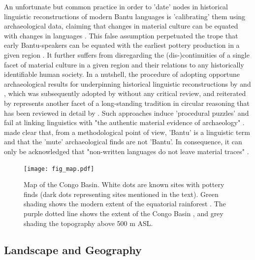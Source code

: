 \documentclass[smallextended,natbib]{svjour3}       %
\begin{document}
An unfortunate but common practice in order to 'date' nodes in historical linguistic reconstructions of modern Bantu languages is 'calibrating' them using archaeological data, claiming that changes in material culture can be equated with changes in languages \citep[see][]{Bostoen.2015,Grollemund.2015,Grollemund.2023,Koile.2022}. This false assumption perpetuated the trope that early Bantu-speakers can be equated with the earliest pottery production in a given region \citep[355, 362, 364]{Bostoen.2015}. It further suffers from disregarding the (dis-)continuities of a single facet of material culture in a given region and their relations to any historically identifiable human society. In a nutshell, the procedure of adopting opportune archaeological results for underpinning historical linguistic reconstructions by \citet{Grollemund.2015} and \citet{Bostoen.2015}, which was subsequently adopted by \citet[SI]{Koile.2022} without any critical review, and reiterated by \citet{Grollemund.2023} represents another facet of a long-standing tradition in circular reasoning \citep{Ehret.1973,Phillipson.1976,Phillipson.1976b,Phillipson.1977a,Heine.1977} that has been reviewed in detail by \citet[82]{Eggert.2005,Eggert.2016a}. Such approaches induce 'procedural puzzles' and fail at linking linguistics with "the authentic material evidence of archaeology" \citep[88]{Eggert.2016a}. \citet[129]{deMaret.1989} made clear that, from a methodological point of view, 'Bantu' is a linguistic term and that the 'mute' archaeological finds are not 'Bantu'. In consequence, it can only be acknowledged that "non-written languages do not leave material traces" \citep[85]{Eggert.2016a}.

\begin{figure}[!tb]
	\texttt{[image: fig\_map.pdf]}
	\caption{Map of the Congo Basin. White dots are known sites with pottery finds (dark dots representing sites mentioned in the text). Green shading shows the modern extent of the equatorial rainforest \citep{White.1983}. The purple dotted line shows the extent of the Congo Basin \citep[11]{Runge.2001}, and grey shading the topography above 500 m ASL.}
	\label{fig:map}
\end{figure}

\subsection*{Landscape and Geography}
\end{document}
